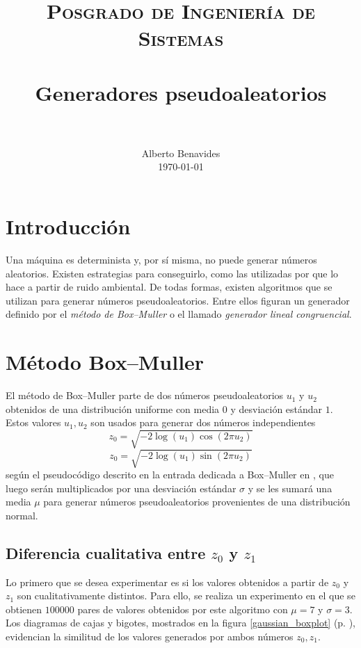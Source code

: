 \documentclass[paper=leter, fontsize=11pt]{scrartcl}
\title{
		\usefont{OT1}{bch}{b}{n}
		\normalfont \normalsize \textsc{Posgrado de Ingeniería de Sistemas} \\ [25pt]
		\horrule{0.5pt} \\[0.4cm]
		\huge Generadores pseudoaleatorios \\
		\horrule{2pt} \\[0.5cm]
}
\author{
		\normalfont 								\normalsize
        Alberto Benavides\\[-3pt]		\normalsize
        \today
}
\date{}
\numberwithin{equation}{section}		%
\numberwithin{figure}{section}			%
\numberwithin{table}{section}				%
\begin{document}
\maketitle

\section{Introducción}

Una máquina es determinista y, por sí misma, no puede generar números aleatorios. Existen estrategias para conseguirlo, como las utilizadas por \citet{random} que lo hace a partir de ruido ambiental. De todas formas, existen algoritmos que se utilizan para generar números pseudoaleatorios. Entre ellos figuran un generador definido por el \textit{método de Box--Muller} o el llamado \textit{generador lineal congruencial}.

\section{Método Box--Muller}
El método de Box--Muller parte de dos números pseudoaleatorios $u_1$ y $u_2$ obtenidos de una distribución uniforme con media $0$ y desviación estándar $1$. Estos valores $u_1, u_2$ son usados para generar dos números independientes 
\begin{equation*}
    z_0 = \sqrt{-2 \log(u_1) \cos(2 \pi u_2)}
\end{equation*}
\begin{equation*}
    z_0 = \sqrt{-2 \log(u_1) \sin(2 \pi u_2)} 
\end{equation*}
según el pseudocódigo descrito en la entrada dedicada a Box--Muller en \citet{box-muller}, que luego serán multiplicados por una desviación estándar $\sigma$ y se les sumará una media $\mu$ para generar números pseudoaleatorios provenientes de una distribución normal.

\subsection{Diferencia cualitativa entre $z_0$ y $z_1$}
Lo primero que se desea experimentar es si los valores obtenidos a partir de $z_0$ y $z_1$ son cualitativamente distintos. Para ello, se realiza un experimento en el que se obtienen $100000$ pares de valores obtenidos por este algoritmo con $\mu = 7$ y $\sigma = 3$. Los diagramas de cajas y bigotes, mostrados en la figura \ref{gaussian_boxplot} (p. \pageref{gaussian_boxplot}), evidencian la similitud de los valores generados por ambos números $z_0, z_1$.
\end{document}
